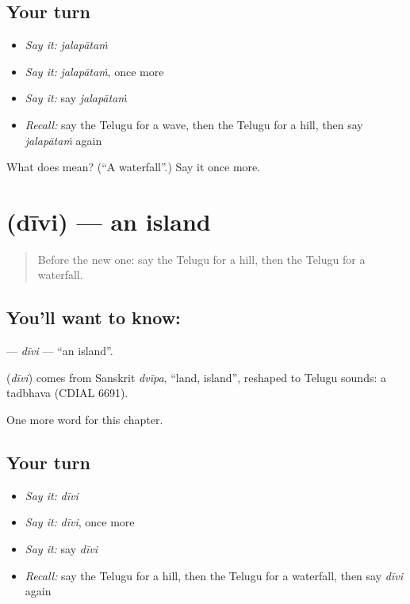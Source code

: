 \subsection*{Your turn}
\begin{itemize}
\raggedright
  \item \emph{Say it:} \emph{jalapātaṁ}
  \item \emph{Say it:} \emph{jalapātaṁ}, once more
  \item \emph{Say it:} say \emph{jalapātaṁ}
  \item \emph{Recall:} say the Telugu for a wave, then the Telugu for a hill, then say \emph{jalapātaṁ} again
\end{itemize}

\begin{tcolorbox}[breakable,colback=teal!4,colframe=teal!35!black,title={Before you move on}]
What does  mean? (\textquotedblleft{}A waterfall\textquotedblright{}.) Say it once more.
\end{tcolorbox}
\section[\texorpdfstring{\te{దీవి} (dīvi)}{దీవి (dīvi)}]{ (dīvi) — an island}

\label{lesson:TE-C122-divi}



\begin{quote}
Before the new one: say the Telugu for a hill, then the Telugu for a waterfall.
\end{quote}

\subsection*{You'll want to know: }
\textbf{} — \emph{dīvi} — \textquotedblleft{}an island\textquotedblright{}.

\begin{cousinweb}
\textbf{} (\emph{dīvi}) comes from Sanskrit \emph{dvīpa}, \textquotedblleft{}land, island\textquotedblright{}, reshaped to Telugu sounds: a tadbhava (CDIAL 6691).
\end{cousinweb}

\begin{grammarlens}[title={What you've built}]
One more word for this chapter.
\end{grammarlens}

\subsection*{Your turn}
\begin{itemize}
\raggedright
  \item \emph{Say it:} \emph{dīvi}
  \item \emph{Say it:} \emph{dīvi}, once more
  \item \emph{Say it:} say \emph{dīvi}
  \item \emph{Recall:} say the Telugu for a hill, then the Telugu for a waterfall, then say \emph{dīvi} again
\end{itemize}

